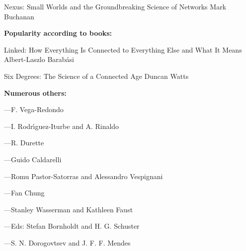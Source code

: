   \bigskip

  {Nexus: Small Worlds and the Groundbreaking Science of Networks}
  {Mark Buchanan}


  \textbf{Popularity according to books:}

  {Linked: How Everything Is Connected to Everything Else and What It Means}
  {Albert-Laszlo Barab\'{a}si}

  \bigskip

  {Six Degrees: The Science of a Connected Age}
  {Duncan Watts\cite{watts2003a}}


  \textbf{Numerous others:}
  
  \small
  
    
     
      ---F. Vega-Redondo\cite{vega-redondo2007a}
     
      ---I. Rodr\'{\i}guez-Iturbe and A. Rinaldo\cite{rodriguez-iturbe1997a}
     
      ---R. Durette
     
      ---Guido Caldarelli
     
      ---Romu Pastor-Satorras and Alessandro Vespignani
     
      ---Fan Chung
     
      ---Stanley Wasserman and Kathleen Faust
     
      ---Eds: Stefan Bornholdt and H. G. Schuster\cite{bornholdt2003a}
     
      ---S. N. Dorogovtsev and J. F. F. Mendes\cite{dorogovtsev2003a}
    


